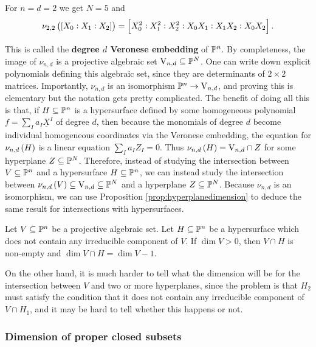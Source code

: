 \begin{example*}
For $ n = d = 2 $ we get $ N = 5 $ and
$$ \nu_{2, 2}\br{\sbr{X_0 : X_1 : X_2}} = \sbr{X_0^2 : X_1^2 : X_2^2 : X_0X_1 : X_1X_2 : X_0X_2}. $$
\end{example*}

This is called the \textbf{degree $ d $ Veronese embedding} of $ \mathbb{P}^n $. By completeness, the image of $ \nu_{n, d} $ is a projective algebraic set $ \mathrm{V}_{n, d} \subseteq \mathbb{P}^N $. One can write down explicit polynomials defining this algebraic set, since they are determinants of $ 2 \times 2 $ matrices. Importantly, $ \nu_{n, d} $ is an isomorphism $ \mathbb{P}^n \to \mathrm{V}_{n, d} $, and proving this is elementary but the notation gets pretty complicated. The benefit of doing all this is that, if $ H \subseteq \mathbb{P}^n $ is a hypersurface defined by some homogeneous polynomial $ f = \sum_I a_I\underline{X}^I $ of degree $ d $, then because the monomials of degree $ d $ become individual homogeneous coordinates via the Veronese embedding, the equation for $ \nu_{n, d}\br{H} $ is a linear equation $ \sum_I a_IZ_I = 0 $. Thus $ \nu_{n, d}\br{H} = \V_{n, d} \cap Z $ for some hyperplane $ Z \subseteq \mathbb{P}^N $. Therefore, instead of studying the intersection between $ V \subseteq \mathbb{P}^n $ and a hypersurface $ H \subseteq \mathbb{P}^n $, we can instead study the intersection between $ \nu_{n, d}\br{V} \subseteq \V_{n, d} \subseteq \PP^N $ and a hyperplane $ Z \subseteq \mathbb{P}^N $. Because $ \nu_{n, d} $ is an isomorphism, we can use Proposition \ref{prop:hyperplanedimension} to deduce the same result for intersections with hypersurfaces.

\begin{theorem}
\label{thm:projectivedimension}
Let $ V \subseteq \mathbb{P}^n $ be a projective algebraic set. Let $ H \subseteq \mathbb{P}^n $ be a hypersurface which does not contain any irreducible component of $ V $. If $ \dim V > 0 $, then $ V \cap H $ is non-empty and $ \dim V \cap H = \dim V - 1 $.
\end{theorem}

On the other hand, it is much harder to tell what the dimension will be for the intersection between $ V $ and two or more hyperplanes, since the problem is that $ H_2 $ must satisfy the condition that it does not contain any irreducible component of $ V \cap H_1 $, and it may be hard to tell whether this happens or not.

\subsubsection{Dimension of proper closed subsets}


